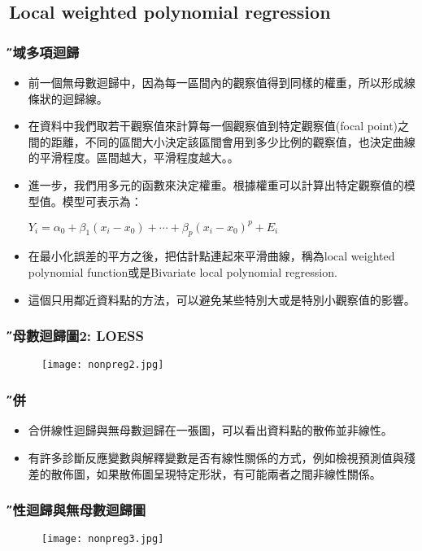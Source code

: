 \documentclass[xcolor=dvipsnames]{beamer}
\begin{document}
\subsection{Local weighted polynomial regression}
\begin{frame}\frametitle{\H 區域多項迴歸}
\begin{itemize}
\item 前一個無母數迴歸中，因為每一區間內的觀察值得到同樣的權重，所以形成線條狀的迴歸線。
\item 在資料中我們取若干觀察值來計算每一個觀察值到特定觀察值(focal point)之間的距離，不同的區間大小決定該區間會用到多少比例的觀察值，也決定曲線的平滑程度。區間越大，平滑程度越大。。
\item 進一步，我們用多元的函數來決定權重。根據權重可以計算出特定觀察值的模型值。模型可表示為：
\begin{center}
$Y_{i}=\alpha_{0}+\beta_{1}(x_{i}-x_{0})+\cdots +\beta_{p}(x_{i}-x_{0})^{p}+E_{i}$
\end{center}
\item 在最小化誤差的平方之後，把估計點連起來平滑曲線，稱為local weighted polynomial function或是Bivariate local polynomial regression. 
\item 這個只用鄰近資料點的方法，可以避免某些特別大或是特別小觀察值的影響。
\end{itemize}
\end{frame}
\begin{frame}\frametitle{\H 無母數迴歸圖2: LOESS}
\begin{figure}
\begin{center}
\texttt{[image: nonpreg2.jpg]}
\end{center}
\end{figure}
\end{frame}
\begin{frame}\frametitle{\H 合併}
\begin{itemize}
\item 合併線性迴歸與無母數迴歸在一張圖，可以看出資料點的散佈並非線性。
\item 有許多診斷反應變數與解釋變數是否有線性關係的方式，例如檢視預測值與殘差的散佈圖，如果散佈圖呈現特定形狀，有可能兩者之間非線性關係。
\end{itemize}
\end{frame}
\begin{frame}\frametitle{\H 線性迴歸與無母數迴歸圖}
\begin{figure}
\begin{center}
\texttt{[image: nonpreg3.jpg]}
\end{center}
\end{figure}
\end{frame}
\end{document}
